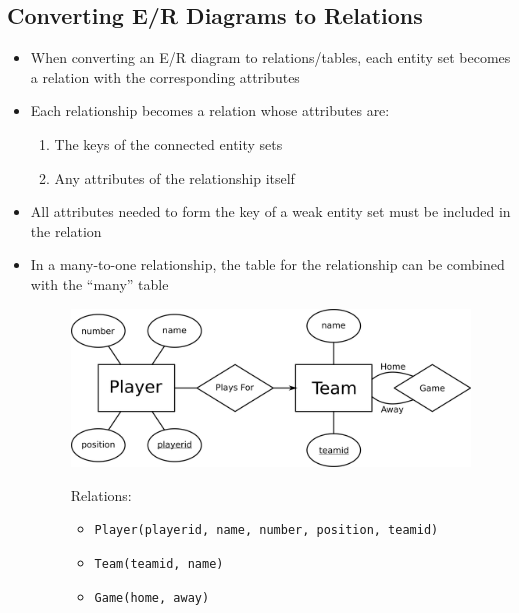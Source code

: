 \documentclass[a4paper]{article}
\begin{document}
\subsection{Converting E/R Diagrams to Relations}
\begin{itemize}
\item When converting an E/R diagram to relations/tables, each entity set becomes a relation with the corresponding attributes
\item Each relationship becomes a relation whose attributes are:
\begin{enumerate}[label=(\roman*)]
\item The keys of the connected entity sets
\item Any attributes of the relationship itself
\end{enumerate}
\item All attributes needed to form the key of a weak entity set must be included in the relation
\item In a many-to-one relationship, the table for the relationship can be combined with the ``many'' table

\begin{figure}[H]
\centering
\includegraphics[width=0.7\linewidth]{entity19.png}\\
\vspace{1em}

\begin{minipage}{0.8\linewidth}
\raggedright
Relations:
\begin{itemize}
\item \lstinline|Player(playerid, name, number, position, teamid)|
\item \lstinline|Team(teamid, name)|
\item \lstinline|Game(home, away)|
\end{itemize}
\end{minipage}
\end{figure}
\end{itemize}
\end{document}

